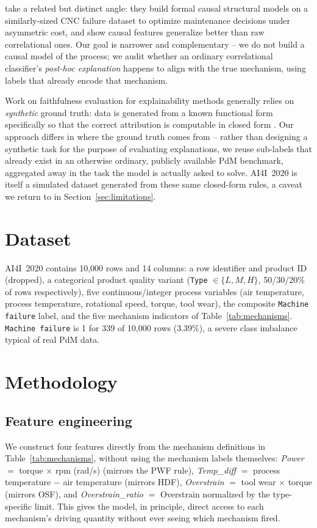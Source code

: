 \documentclass[11pt]{article}
\begin{document}
\citet{causalbenchmark2026} take a related but distinct angle: they build formal causal structural
models on a similarly-sized CNC failure dataset to optimize maintenance decisions under asymmetric
cost, and show causal features generalize better than raw correlational ones. Our goal is narrower
and complementary -- we do not build a causal model of the process; we audit whether an ordinary
correlational classifier's \emph{post-hoc explanation} happens to align with the true mechanism,
using labels that already encode that mechanism.

Work on faithfulness evaluation for explainability methods generally relies on \emph{synthetic}
ground truth: data is generated from a known functional form specifically so that the correct
attribution is computable in closed form \citep{liu2021synthetic}. Our approach differs in
where the ground truth comes from -- rather than designing a synthetic task for the purpose of
evaluating explanations, we reuse sub-labels that already exist in an otherwise ordinary,
publicly available PdM benchmark, aggregated away in the task the model is actually asked to solve.
AI4I~2020 is itself a simulated dataset generated from these same closed-form rules, a caveat we
return to in Section~\ref{sec:limitations}.

\section{Dataset}

AI4I~2020 \citep{matzka2020explainable} contains 10{,}000 rows and 14 columns: a row identifier and
product ID (dropped), a categorical product quality variant (\texttt{Type} $\in \{L, M, H\}$, 50/30/20\%
of rows respectively), five continuous/integer process variables (air temperature, process
temperature, rotational speed, torque, tool wear), the composite \texttt{Machine failure} label, and
the five mechanism indicators of Table~\ref{tab:mechanisms}. \texttt{Machine failure} is 1 for 339
of 10{,}000 rows (3.39\%), a severe class imbalance typical of real PdM data.

\section{Methodology}

\subsection{Feature engineering}
We construct four features directly from the mechanism definitions in Table~\ref{tab:mechanisms},
without using the mechanism labels themselves: \emph{Power} $=$ torque $\times$ rpm (rad/s) (mirrors
the PWF rule), \emph{Temp\_diff} $=$ process temperature $-$ air temperature (mirrors HDF),
\emph{Overstrain} $=$ tool wear $\times$ torque (mirrors OSF), and \emph{Overstrain\_ratio} $=$
Overstrain normalized by the type-specific limit. This gives the model, in principle, direct access
to each mechanism's driving quantity without ever seeing which mechanism fired.
\end{document}
